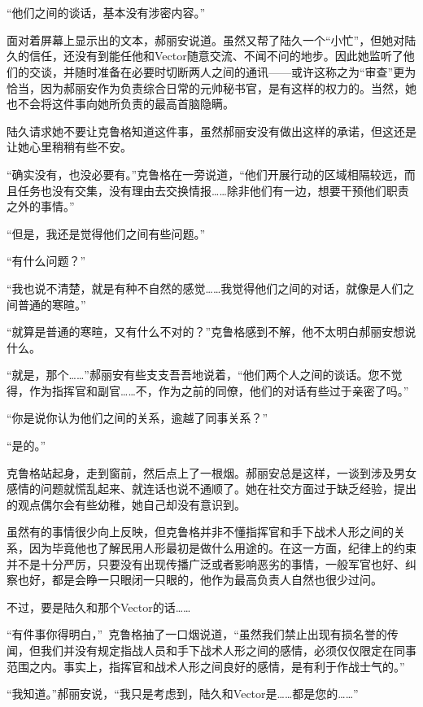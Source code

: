 \section*{}

“他们之间的谈话，基本没有涉密内容。”

面对着屏幕上显示出的文本，郝丽安说道。虽然又帮了陆久一个“小忙”，但她对陆久的信任，还没有到能任他和Vector随意交流、不闻不问的地步。因此她监听了他们的交谈，并随时准备在必要时切断两人之间的通讯——或许这称之为“审查”更为恰当，因为郝丽安作为负责综合日常的元帅秘书官，是有这样的权力的。当然，她也不会将这件事向她所负责的最高首脑隐瞒。

陆久请求她不要让克鲁格知道这件事，虽然郝丽安没有做出这样的承诺，但这还是让她心里稍稍有些不安。

“确实没有，也没必要有。”克鲁格在一旁说道，“他们开展行动的区域相隔较远，而且任务也没有交集，没有理由去交换情报……除非他们有一边，想要干预他们职责之外的事情。”

“但是，我还是觉得他们之间有些问题。”

“有什么问题？”

“我也说不清楚，就是有种不自然的感觉……我觉得他们之间的对话，就像是人们之间普通的寒暄。”

“就算是普通的寒暄，又有什么不对的？”克鲁格感到不解，他不太明白郝丽安想说什么。

“就是，那个……”郝丽安有些支支吾吾地说着，“他们两个人之间的谈话。您不觉得，作为指挥官和副官……不，作为之前的同僚，他们的对话有些过于亲密了吗。”

“你是说你认为他们之间的关系，逾越了同事关系？”

“是的。”

克鲁格站起身，走到窗前，然后点上了一根烟。郝丽安总是这样，一谈到涉及男女感情的问题就慌乱起来、就连话也说不通顺了。她在社交方面过于缺乏经验，提出的观点偶尔会有些幼稚，她自己却没有意识到。

虽然有的事情很少向上反映，但克鲁格并非不懂指挥官和手下战术人形之间的关系，因为毕竟他也了解民用人形最初是做什么用途的。在这一方面，纪律上的约束并不是十分严厉，只要没有出现传播广泛或者影响恶劣的事情，一般军官也好、纠察也好，都是会睁一只眼闭一只眼的，他作为最高负责人自然也很少过问。

不过，要是陆久和那个Vector的话……

“有件事你得明白，” 克鲁格抽了一口烟说道，“虽然我们禁止出现有损名誉的传闻，但我们并没有规定指战人员和手下战术人形之间的感情，必须仅仅限定在同事范围之内。事实上，指挥官和战术人形之间良好的感情，是有利于作战士气的。” 

“我知道。”郝丽安说，“我只是考虑到，陆久和Vector是……都是您的……”

